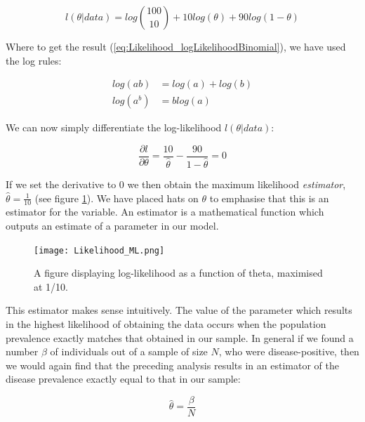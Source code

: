 \documentclass[11pt,fullpage]{book}
\begin{document}
\begin{equation}\label{eq:Likelihood_logLikelihoodBinomial}
l(\theta|data) = log{100 \choose 10}+ 10log(\theta)+ 90 log(1-\theta)
\end{equation}

Where to get the result (\ref{eq:Likelihood_logLikelihoodBinomial}), we have used the log rules:

\begin{equation}\label{eq:Likelihood_logRules}
\begin{align}
log(ab) &= log(a) + log(b)\\
log(a^b) &= blog(a)
\end{align}
\end{equation}

We can now simply differentiate the log-likelihood $l(\theta|data)$:

\begin{equation}\label{eq:Likelihood_binomialderiv}
\frac{\partial l}{\partial \theta} = \frac{10}{\hat{\theta}}-\frac{90}{1-\hat{\theta}} = 0
\end{equation}

If we set the derivative to 0 we then obtain the maximum likelihood \textit{estimator}, $\hat{\theta} = \frac{1}{10}$ (see figure \ref{fig:Likelihood_MLE}). We have placed hats on $\theta$ to emphasise that this is an estimator for the variable. An estimator is a mathematical function which outputs an estimate of a parameter in our model.

\begin{figure}
\centering
\scalebox{0.75} 
{\texttt{[image: Likelihood\_ML.png]}}
\caption{A figure displaying log-likelihood as a function of theta, maximised at 1/10.}\label{fig:Likelihood_MLE}
\end{figure}


This estimator makes sense intuitively. The value of the parameter which results in the highest likelihood of obtaining the data occurs when the population prevalence exactly matches that obtained in our sample. In general if we found a number $\beta$ of individuals out of a sample of size $N$, who were disease-positive, then we would again find that the preceding analysis results in an estimator of the disease prevalence exactly equal to that in our sample:

\begin{equation}\label{eq:Likelihood_binomialestimator}
\hat{\theta} = \frac{\beta}{N}
\end{equation}
\end{document}
